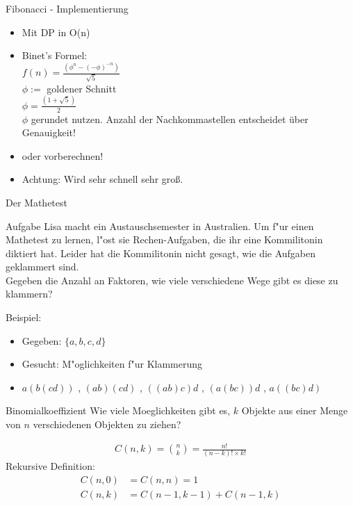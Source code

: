 \documentclass[18pt]{beamer}
\begin{document}
\begin{frame}{Fibonacci - Implementierung}
\begin{itemize}
\item Mit DP in O(n)
\item Binet's Formel: \\
\(f(n) = \frac{(\phi^{n} - (-\phi)^{-n}) }{ \sqrt{5}}\)\\
\(\phi :=\)  goldener Schnitt\\
\(\phi = \frac{ (1+\sqrt{5})}{2}\)\\
\(\phi\) gerundet nutzen. Anzahl der Nachkommastellen entscheidet über Genauigkeit!

\item oder vorberechnen!\\
\item Achtung: Wird sehr schnell sehr groß.
\end{itemize}
\end{frame}

\begin{frame}{Der Mathetest}
\begin{block}{Aufgabe}
Lisa macht ein Austauschsemester in Australien. Um f"ur einen Mathetest zu lernen, l"ost sie Rechen-Aufgaben, die ihr eine Kommilitonin diktiert hat. Leider hat die Kommilitonin nicht gesagt, wie die Aufgaben geklammert sind. \\
Gegeben die Anzahl an Faktoren, wie viele verschiedene Wege gibt es diese zu klammern?
\end{block}
Beispiel:
\begin{itemize}
\item Gegeben: $\lbrace a, b, c, d \rbrace$
\item Gesucht: M"oglichkeiten f"ur Klammerung
\item $ a \left( b \left( c d \right) \right) $ , $\left( a b \right) \left( c d \right) $ , $\left( \left( a b \right) c \right) d$ , $\left( a \left( b  c \right) \right) d $ , $ a \left( \left( b  c \right) d \right) $
\end{itemize}
\end{frame}

\begin{frame}{Binomialkoeffizient}
Wie viele Moeglichkeiten gibt es, $k$ Objekte aus einer Menge von $n$ verschiedenen Objekten zu ziehen?

\begin{align*}
C\left( n,k \right) = \binom{n}{k} = \frac{n!}{\left( n-k \right) ! \times k!}
\end{align*}
Rekursive Definition:
\begin{align*}
C\left( n, 0 \right) &= C\left( n,n \right) = 1 \\
C\left( n,k \right) &= C\left( n-1,k-1 \right) + C\left( n-1,k \right)
\end{align*} %

\end{frame}
\end{document}
